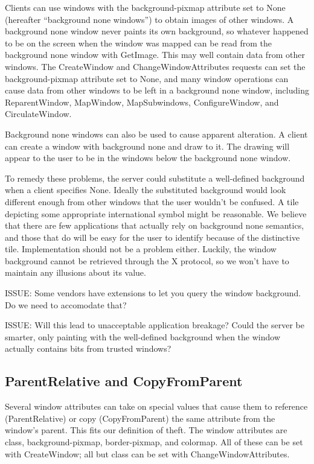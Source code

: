 \documentclass{article}
\begin{document}
Clients can use windows with the background-pixmap attribute set to
None (hereafter ``background none windows'') to obtain images of other
windows.  A background none window never paints its own background, so
whatever happened to be on the screen when the window was mapped can
be read from the background none window with GetImage.  This may well
contain data from other windows.  The CreateWindow and
ChangeWindowAttributes requests can set the background-pixmap
attribute set to None, and many window operations can cause data from
other windows to be left in a background none window, including
ReparentWindow, MapWindow, MapSubwindows, ConfigureWindow, and
CirculateWindow.

Background none windows can also be used to cause apparent alteration.
A client can create a window with background none and draw to it.  The
drawing will appear to the user to be in the windows below the
background none window.

To remedy these problems, the server could substitute a well-defined
background when a client specifies None.  Ideally the substituted
background would look different enough from other windows that the
user wouldn't be confused.  A tile depicting some appropriate
international symbol might be reasonable.  We believe that there are
few applications that actually rely on background none semantics, and
those that do will be easy for the user to identify because of the
distinctive tile.  Implementation should not be a problem either.
Luckily, the window background cannot be retrieved through the X
protocol, so we won't have to maintain any illusions about its value.

ISSUE: Some vendors have extensions to let you query the window
background.  Do we need to accomodate that?

ISSUE: Will this lead to unacceptable application breakage?  Could the
server be smarter, only painting with the well-defined background when
the window actually contains bits from trusted windows?

\subsection{ParentRelative and CopyFromParent}

Several window attributes can take on special values that cause them
to reference (ParentRelative) or copy (CopyFromParent) the same
attribute from the window's parent.  This fits our definition of theft.
The window attributes are class, background-pixmap, border-pixmap, and
colormap.  All of these can be set with CreateWindow; all but class
can be set with ChangeWindowAttributes.
\end{document}
